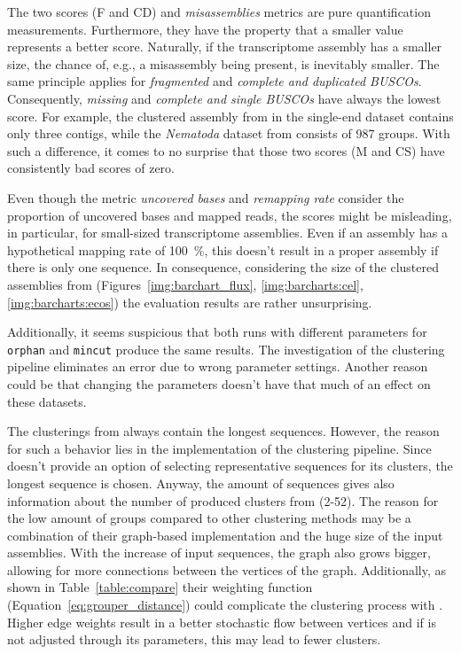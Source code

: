 \documentclass[12pt,a4paper,english]{article}
\begin{document}
		The two \busco scores (F and CD) and \textit{misassemblies} metrics are pure quantification measurements. Furthermore, they have the property that a smaller value represents a better score.
		Naturally, if the transcriptome assembly has a smaller size, the chance of, e.g., a misassembly being present, is inevitably smaller. The same principle applies for \textit{fragmented} and \textit{complete and duplicated BUSCOs}. 
		Consequently, \textit{missing} and \textit{complete and single BUSCOs} have always the lowest score. For example, the clustered assembly from \grouper in the single-end \celegans dataset contains only three contigs, while the \textit{Nematoda} dataset from \busco consists of 987 \busco groups. With such a difference, it comes to no surprise that those two \busco scores (M and CS) have consistently bad scores of zero.
		
		Even though the metric \textit{uncovered bases} and \textit{remapping rate} consider the proportion of uncovered bases and mapped reads, the scores might be misleading, in particular, for small-sized transcriptome assemblies. Even if an assembly has a hypothetical mapping rate of 100~\%, this doesn't result in a proper assembly if there is only one sequence.    
		In consequence, considering the size of the clustered assemblies from \grouper (Figures~\ref{img:barchart_flux}, \ref{img:barcharts:cel}, \ref{img:barcharts:ecos}) the evaluation results are rather unsurprising.
		
		Additionally, it seems suspicious that both runs with different parameters for \texttt{orphan} and \texttt{mincut} produce the same results. The investigation of the clustering pipeline eliminates an error due to wrong parameter settings. Another reason could be that changing the parameters doesn't have that much of an effect on these datasets.
		
		The clusterings from \grouper always contain the longest sequences. However, the reason for such a behavior lies in the implementation of the clustering pipeline. Since \grouper doesn't provide an option of selecting representative sequences for its clusters, the longest sequence is chosen.
		Anyway, the amount of sequences gives also information about the number of produced clusters from \grouper (2-52). The reason for the low amount of groups compared to other clustering methods may be a combination of their graph-based implementation and the huge size of the input assemblies.
		With the increase of input sequences, the graph also grows bigger, allowing for more connections between the vertices of the graph. Additionally, as shown in Table~\ref{table:compare} their weighting function (Equation~\ref{eq:grouper_distance}) could complicate the clustering process with \mcl. Higher edge weights result in a better stochastic flow between vertices and if \mcl is not adjusted through its parameters, this may lead to fewer clusters.
	
\end{document}
